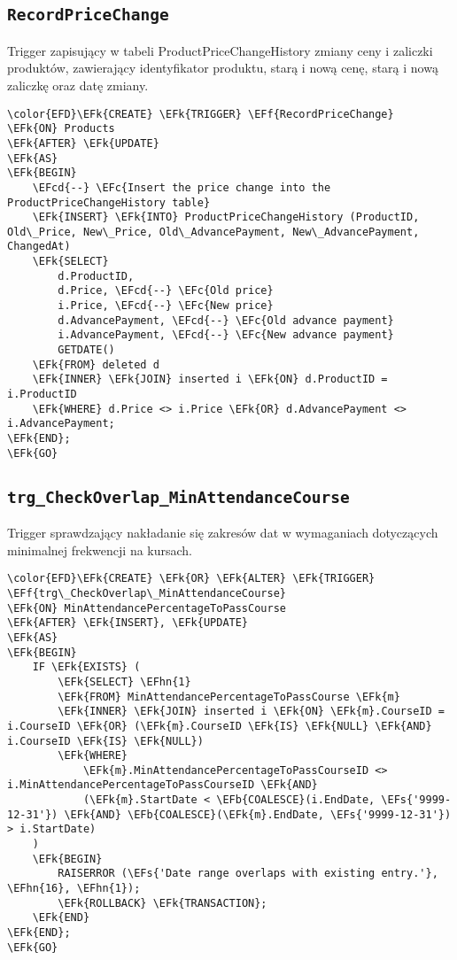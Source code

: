 \documentclass[11pt]{article}
\newcommand{\EFc}[1]{\textcolor{EFc}{\textit{#1}}} %
\newcommand{\EFcd}[1]{\textcolor{EFcd}{\textit{#1}}} %
\newcommand{\EFs}[1]{\textcolor{EFs}{#1}} %
\newcommand{\EFk}[1]{\textcolor{EFk}{\textbf{#1}}} %
\newcommand{\EFb}[1]{\textcolor{EFb}{\textbf{#1}}} %
\newcommand{\EFf}[1]{\textcolor{EFf}{#1}} %
\newcommand{\EFhn}[1]{\textcolor{EFhn}{#1}} %
\begin{document}
\subsection{\texttt{RecordPriceChange}}
\label{sec:org1cfd17d}
Trigger zapisujący w tabeli ProductPriceChangeHistory zmiany ceny i zaliczki produktów, zawierający identyfikator produktu, starą i nową cenę, starą i nową zaliczkę oraz datę zmiany.
\begin{Code}
\begin{Verbatim}
\color{EFD}\EFk{CREATE} \EFk{TRIGGER} \EFf{RecordPriceChange}
\EFk{ON} Products
\EFk{AFTER} \EFk{UPDATE}
\EFk{AS}
\EFk{BEGIN}
    \EFcd{--} \EFc{Insert the price change into the ProductPriceChangeHistory table}
    \EFk{INSERT} \EFk{INTO} ProductPriceChangeHistory (ProductID, Old\_Price, New\_Price, Old\_AdvancePayment, New\_AdvancePayment, ChangedAt)
    \EFk{SELECT} 
        d.ProductID,
        d.Price, \EFcd{--} \EFc{Old price}
        i.Price, \EFcd{--} \EFc{New price}
        d.AdvancePayment, \EFcd{--} \EFc{Old advance payment}
        i.AdvancePayment, \EFcd{--} \EFc{New advance payment}
        GETDATE()
    \EFk{FROM} deleted d
    \EFk{INNER} \EFk{JOIN} inserted i \EFk{ON} d.ProductID = i.ProductID
    \EFk{WHERE} d.Price <> i.Price \EFk{OR} d.AdvancePayment <> i.AdvancePayment;
\EFk{END};
\EFk{GO}
\end{Verbatim}
\end{Code}
\subsection{\texttt{trg\_CheckOverlap\_MinAttendanceCourse}}
\label{sec:org128a38f}
Trigger sprawdzający nakładanie się zakresów dat w wymaganiach dotyczących minimalnej frekwencji na kursach.
\begin{Code}
\begin{Verbatim}
\color{EFD}\EFk{CREATE} \EFk{OR} \EFk{ALTER} \EFk{TRIGGER} \EFf{trg\_CheckOverlap\_MinAttendanceCourse}
\EFk{ON} MinAttendancePercentageToPassCourse
\EFk{AFTER} \EFk{INSERT}, \EFk{UPDATE}
\EFk{AS}
\EFk{BEGIN}
    IF \EFk{EXISTS} (
        \EFk{SELECT} \EFhn{1} 
        \EFk{FROM} MinAttendancePercentageToPassCourse \EFk{m}
        \EFk{INNER} \EFk{JOIN} inserted i \EFk{ON} \EFk{m}.CourseID = i.CourseID \EFk{OR} (\EFk{m}.CourseID \EFk{IS} \EFk{NULL} \EFk{AND} i.CourseID \EFk{IS} \EFk{NULL})
        \EFk{WHERE} 
            \EFk{m}.MinAttendancePercentageToPassCourseID <> i.MinAttendancePercentageToPassCourseID \EFk{AND}
            (\EFk{m}.StartDate < \EFb{COALESCE}(i.EndDate, \EFs{'9999-12-31'}) \EFk{AND} \EFb{COALESCE}(\EFk{m}.EndDate, \EFs{'9999-12-31'}) > i.StartDate)
    )
    \EFk{BEGIN}
        RAISERROR (\EFs{'Date range overlaps with existing entry.'}, \EFhn{16}, \EFhn{1});
        \EFk{ROLLBACK} \EFk{TRANSACTION};
    \EFk{END}
\EFk{END};
\EFk{GO}
\end{Verbatim}
\end{Code}
\end{document}
